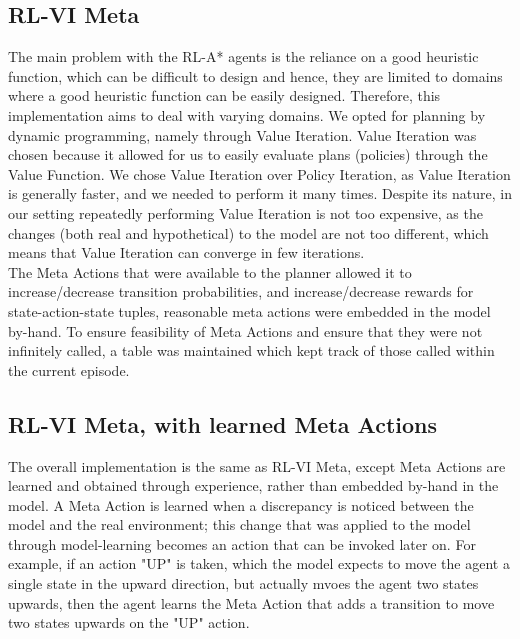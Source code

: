 \subsection{RL-VI Meta}
The main problem with the RL-A* agents is the reliance on a good heuristic function, which can be difficult to design and hence, they are limited to domains where a good heuristic function can be easily designed.
Therefore, this implementation aims to deal with varying domains. We opted for planning by dynamic programming, namely through Value Iteration. Value Iteration was chosen because it allowed for us to easily evaluate plans (policies) through the Value Function. We chose Value Iteration over Policy Iteration, as Value Iteration is generally faster, and we needed to perform it many times. Despite its nature, in our setting repeatedly performing Value Iteration is not too expensive, as the changes (both real and hypothetical) to the model are not too different, which means that Value Iteration can converge in few iterations.
\\The Meta Actions that were available to the planner allowed it to increase/decrease transition probabilities, and increase/decrease rewards for state-action-state tuples, reasonable meta actions were embedded in the model by-hand. 
To ensure feasibility of Meta Actions and ensure that they were not infinitely called, a table was maintained which kept track of those called within the current episode.
\subsection{RL-VI Meta, with learned Meta Actions}
The overall implementation is the same as RL-VI Meta, except Meta Actions are learned and obtained through experience, rather than embedded by-hand in the model. A Meta Action is learned when a discrepancy is noticed between the model and the real environment; this change that was applied to the model through model-learning becomes an action that can be invoked later on. For example, if an action "UP" is taken, which the model expects to move the agent a single state in the upward direction, but actually mvoes the agent two states upwards, then the agent learns the Meta Action that adds a transition to move two states upwards on the "UP" action.


